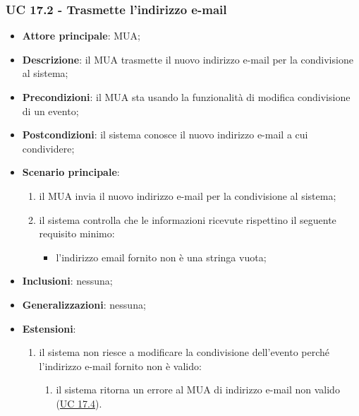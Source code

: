    \subsubsection{UC 17.2 - Trasmette l'indirizzo e-mail} \label{sec:UC17.2}
    \begin{itemize}
        \item \textbf{Attore principale}: MUA;
        \item \textbf{Descrizione}: il MUA trasmette il nuovo indirizzo e-mail per la condivisione al sistema;
        \item \textbf{Precondizioni}: il MUA sta usando la funzionalità di modifica condivisione di un evento;
        \item \textbf{Postcondizioni}: il sistema conosce il nuovo indirizzo e-mail a cui condividere;
        \item \textbf{Scenario principale}:
            \begin{enumerate}
                \item il MUA invia il nuovo indirizzo e-mail per la condivisione al sistema;
                \item il sistema controlla che le informazioni ricevute rispettino il seguente requisito minimo:
                    \begin{itemize}
                        \item l'indirizzo email fornito non è una stringa vuota;
                    \end{itemize}
            \end{enumerate}
        \item \textbf{Inclusioni}: nessuna;
        \item \textbf{Generalizzazioni}: nessuna;
        \item \textbf{Estensioni}:
            \begin{enumerate}[label=\alph*.]
                \item il sistema non riesce a modificare la condivisione dell'evento perché l'indirizzo e-mail fornito non è valido:
                \begin{enumerate}[label=\arabic*.]
                    \item il sistema ritorna un errore al MUA di indirizzo e-mail non valido (\hyperref[sec:UC17.4]{UC 17.4}).
                \end{enumerate}
            \end{enumerate}
    \end{itemize}


